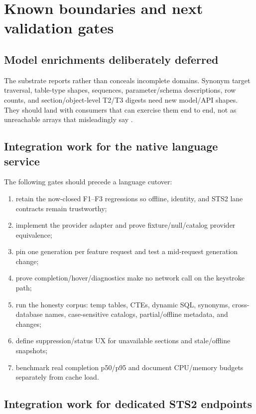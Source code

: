 \documentclass[11pt]{article}
\newcommand{\code}[1]{\texttt{\detokenize{#1}}}
\begin{document}
\section{Known boundaries and next validation gates}

\subsection{Model enrichments deliberately deferred}

The substrate reports rather than conceals incomplete domains. Synonym target traversal, table-type shapes, sequences, parameter/schema descriptions, row counts, and section/object-level T2/T3 digests need new model/API shapes. They should land with consumers that can exercise them end to end, not as unreachable arrays that misleadingly say \code{ready}.

\subsection{Integration work for the native language service}

The following gates should precede a language cutover:

\begin{enumerate}
  \item retain the now-closed F1--F3 regressions so offline, identity, and STS2 lane contracts remain trustworthy;
  \item implement the provider adapter and prove fixture/null/catalog provider equivalence;
  \item pin one generation per feature request and test a mid-request generation change;
  \item prove completion/hover/diagnostics make no network call on the keystroke path;
  \item run the honesty corpus: temp tables, CTEs, dynamic SQL, synonyms, cross-database names, case-sensitive catalogs, partial/offline metadata, and \code{USE} changes;
  \item define suppression/status UX for unavailable sections and stale/offline snapshots;
  \item benchmark real completion p50/p95 and document CPU/memory budgets separately from cache load.
\end{enumerate}

\subsection{Integration work for dedicated STS2 endpoints}
\end{document}
